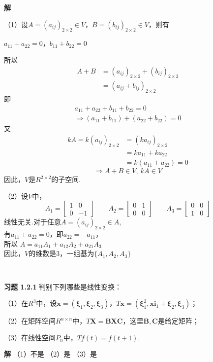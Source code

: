 \documentclass[12pt, a4paper, oneside, fontset=none]{ctexart}
\begin{document}
\textbf{解} \par
（1）设$A = (a_{ij})_{2 \times 2} \in V$，$B = (b_{ij})_{2 \times 2} \in V$，则有 \\
\centerline{$a_{11} + a_{22} = 0$，$b_{11}+b_{22} = 0$}
所以
\begin{align*}
    A + B & = (a_{ij})_{2\times 2} + (b_{ij})_{2\times 2} \\
          & = (a_{ij} + b_{ij})_{2\times 2}
\end{align*}
即
\begin{align*}
    a_{11} + a_{22} + b_{11} + b_{22} = 0 \\
    \Rightarrow (a_{11} + b_{11}) + (a_{22} + b_{22}) = 0
\end{align*}
又
\begin{align*}
    kA = k(a_{ij})_{2\times 2} & = (ka_{ij})_{2 \times 2} \\
                               & = ka_{11} + ka_{22}      \\
                               & = k(a_{11} + a_{22}) = 0
\end{align*}
$$\Rightarrow A + B \in V, \ kA \in V$$
因此，$V$是$R^{2\times 2}$的子空间. \par
（2）设$V$中，
$$
    A_1 = \begin{bmatrix}
        1 & 0  \\
        0 & -1
    \end{bmatrix} \qquad A_2 = \begin{bmatrix}
        0 & 1 \\
        0 & 0
    \end{bmatrix} \qquad A_3 = \begin{bmatrix}
        0 & 0 \\
        1 & 0
    \end{bmatrix}
$$
线性无关.对于任意$A = (a_{ij})_{2 \times 2} \in A$,\\
有$a_{11} + a_{22} = 0$，即$a_{22} = -a_{11}$， \\
所以 $A = a_{11}A_1 + a_{12}A_2 + a_{21}A_3$ \\
因此，$V$的维数是3，一组基为$\{A_1, A_2, A_3\}$ \par \ \par

\textbf{习题 1.2.1} \quad 判别下列哪些是线性变换：\par
（1）在$R^3$中，设$\bm{x} = (\bm{\xi}_1, \bm{\xi}_2, \bm{\xi}_3)$，$T\bm{x} = (\bm{\xi}_1^2, \bm{xi}_1 + \bm{\xi}_2, \bm{\xi}_3)$； \par
（2）在矩阵空间$R^{n \times n}$中，$T\mathbf{X} = \mathbf{BXC}$，这里$\mathbf{B,C}$是给定矩阵；\par
（3）在线性空间$P_n$中，$Tf(t) = f(t + 1)$.

\textbf{解} \quad
（1）不是
（2）是
（3）是
\end{document}
